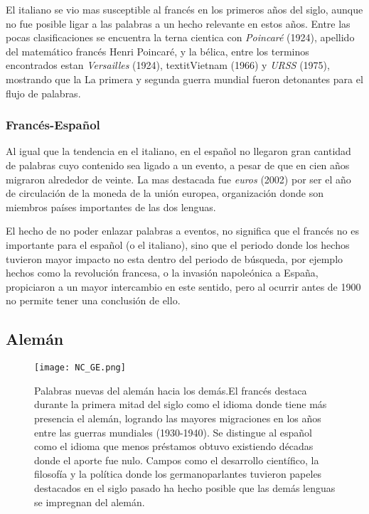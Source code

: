 {El italiano se vio mas susceptible al francés en los primeros años del siglo, aunque no fue posible ligar a las palabras a un hecho relevante en estos años. Entre las pocas clasificaciones se encuentra la terna cientica con \textit{Poincaré} (1924), apellido del matemático francés Henri Poincaré, y la bélica,  entre los terminos encontrados estan \textit{Versailles} (1924), textit{Vietnam} (1966)  y \textit{URSS} (1975), mostrando que la  La primera y segunda guerra mundial fueron detonantes para el flujo de palabras.


\subsubsection*{Francés-Español}%

Al igual que la tendencia en el italiano, en el español no llegaron gran cantidad de palabras cuyo contenido sea ligado a un evento, a pesar de que en cien años migraron alrededor de veinte. La mas destacada fue \textit{euros} (2002) por ser el año de circulación de la moneda de la unión europea, organización donde son miembros países importantes de las dos lenguas. 

El hecho de no poder enlazar palabras a eventos, no significa que el francés no es importante para el español (o el italiano), sino que el periodo donde los hechos tuvieron mayor impacto no esta dentro del periodo de búsqueda,  por ejemplo hechos como la revolución francesa, o la invasión napoleónica a España, propiciaron a un mayor intercambio en este sentido, pero al ocurrir antes de 1900 no permite tener una conclusión de ello. 


\subsection{Alemán}%

\begin{figure}[h!]
	\centering
	\texttt{[image: NC\_GE.png]}
	\label{fig.NC_GE}
	\caption{Palabras nuevas del alemán hacia los demás.El francés destaca durante la primera mitad del siglo como el idioma donde tiene más presencia el alemán, logrando las mayores migraciones en los años entre las guerras mundiales (1930-1940). Se distingue al español como el idioma que menos préstamos obtuvo  existiendo décadas donde el aporte fue nulo.  Campos como el desarrollo científico, la filosofía  y la política donde los germanoparlantes tuvieron papeles destacados en el siglo pasado ha hecho posible que las demás lenguas se impregnan del alemán.}
\end{figure}




}
